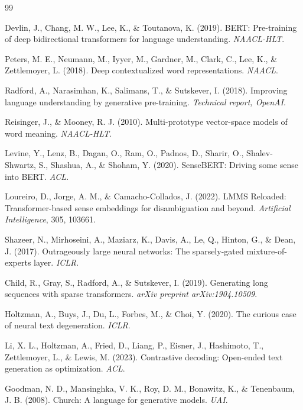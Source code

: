 \documentclass[11pt,a4paper]{article}
\begin{document}
\begin{thebibliography}{99}

Devlin, J., Chang, M. W., Lee, K., \& Toutanova, K. (2019).
BERT: Pre-training of deep bidirectional transformers for language understanding.
\textit{NAACL-HLT}.

Peters, M. E., Neumann, M., Iyyer, M., Gardner, M., Clark, C., Lee, K., \& Zettlemoyer, L. (2018).
Deep contextualized word representations.
\textit{NAACL}.

Radford, A., Narasimhan, K., Salimans, T., \& Sutskever, I. (2018).
Improving language understanding by generative pre-training.
\textit{Technical report, OpenAI}.

Reisinger, J., \& Mooney, R. J. (2010).
Multi-prototype vector-space models of word meaning.
\textit{NAACL-HLT}.

Levine, Y., Lenz, B., Dagan, O., Ram, O., Padnos, D., Sharir, O., Shalev-Shwartz, S., Shashua, A., \& Shoham, Y. (2020).
SenseBERT: Driving some sense into BERT.
\textit{ACL}.

Loureiro, D., Jorge, A. M., \& Camacho-Collados, J. (2022).
LMMS Reloaded: Transformer-based sense embeddings for disambiguation and beyond.
\textit{Artificial Intelligence}, 305, 103661.

Shazeer, N., Mirhoseini, A., Maziarz, K., Davis, A., Le, Q., Hinton, G., \& Dean, J. (2017).
Outrageously large neural networks: The sparsely-gated mixture-of-experts layer.
\textit{ICLR}.

Child, R., Gray, S., Radford, A., \& Sutskever, I. (2019).
Generating long sequences with sparse transformers.
\textit{arXiv preprint arXiv:1904.10509}.

Holtzman, A., Buys, J., Du, L., Forbes, M., \& Choi, Y. (2020).
The curious case of neural text degeneration.
\textit{ICLR}.

Li, X. L., Holtzman, A., Fried, D., Liang, P., Eisner, J., Hashimoto, T., Zettlemoyer, L., \& Lewis, M. (2023).
Contrastive decoding: Open-ended text generation as optimization.
\textit{ACL}.

Goodman, N. D., Mansinghka, V. K., Roy, D. M., Bonawitz, K., \& Tenenbaum, J. B. (2008).
Church: A language for generative models.
\textit{UAI}.


\end{thebibliography}
\end{document}
